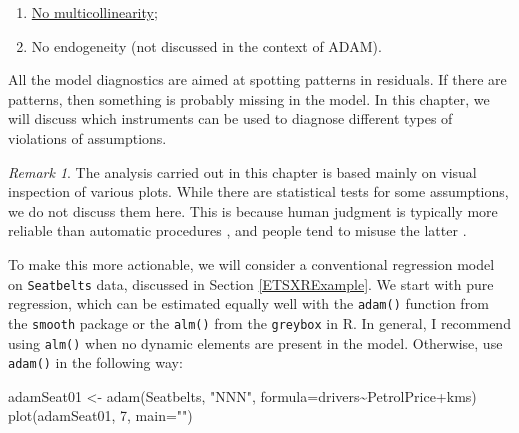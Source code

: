 \documentclass[
]{book}
\newenvironment{Shaded}{\begin{snugshade}}{\end{snugshade}}
\newcommand{\AttributeTok}[1]{\textcolor[rgb]{0.77,0.63,0.00}{#1}}
\newcommand{\DecValTok}[1]{\textcolor[rgb]{0.00,0.00,0.81}{#1}}
\newcommand{\FunctionTok}[1]{\textcolor[rgb]{0.00,0.00,0.00}{#1}}
\newcommand{\NormalTok}[1]{#1}
\newcommand{\OtherTok}[1]{\textcolor[rgb]{0.56,0.35,0.01}{#1}}
\newcommand{\SpecialCharTok}[1]{\textcolor[rgb]{0.00,0.00,0.00}{#1}}
\newcommand{\StringTok}[1]{\textcolor[rgb]{0.31,0.60,0.02}{#1}}
\providecommand{\tightlist}{%
  \setlength{\itemsep}{0pt}\setlength{\parskip}{0pt}}
\theoremstyle{definition}
\theoremstyle{definition}
\theoremstyle{definition}
\theoremstyle{definition}
\theoremstyle{remark}
\newtheorem*{remark}{Remark}
\begin{document}
\begin{enumerate}
\def\labelenumi{\alph{enumi}.}
\tightlist
\item
  \protect\hyperlink{diagnosticsMulticollinearity}{No multicollinearity};
\item
  No endogeneity (not discussed in the context of ADAM).
\end{enumerate}

All the model diagnostics are aimed at spotting patterns in residuals. If there are patterns, then something is probably missing in the model. In this chapter, we will discuss which instruments can be used to diagnose different types of violations of assumptions.

\begin{remark}
The analysis carried out in this chapter is based mainly on visual inspection of various plots. While there are statistical tests for some assumptions, we do not discuss them here. This is because human judgment is typically more reliable than automatic procedures \citep{Petropoulos2018a}, and people tend to misuse the latter \citep{Wasserstein2016}.
\end{remark}

To make this more actionable, we will consider a conventional regression model on \texttt{Seatbelts} data, discussed in Section \ref{ETSXRExample}. We start with pure regression, which can be estimated equally well with the \texttt{adam()} function from the \texttt{smooth} package or the \texttt{alm()} from the \texttt{greybox} in R. In general, I recommend using \texttt{alm()} when no dynamic elements are present in the model. Otherwise, use \texttt{adam()} in the following way:

\begin{Shaded}
\begin{Highlighting}[]
\NormalTok{adamSeat01 }\OtherTok{\textless{}{-}} \FunctionTok{adam}\NormalTok{(Seatbelts, }\StringTok{"NNN"}\NormalTok{,}
                   \AttributeTok{formula=}\NormalTok{drivers}\SpecialCharTok{\textasciitilde{}}\NormalTok{PetrolPrice}\SpecialCharTok{+}\NormalTok{kms)}
\FunctionTok{plot}\NormalTok{(adamSeat01, }\DecValTok{7}\NormalTok{, }\AttributeTok{main=}\StringTok{""}\NormalTok{)}
\end{Highlighting}
\end{Shaded}
\end{document}
